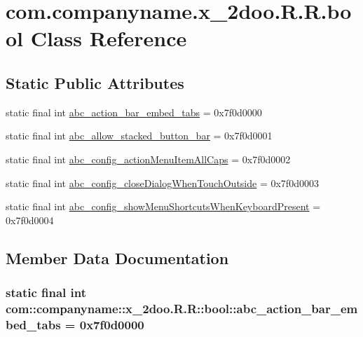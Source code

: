 \hypertarget{classcom_1_1companyname_1_1x__2doo_1_1_r_1_1bool}{
\section{com.companyname.x\_\-2doo.R.R.bool Class Reference}
\label{classcom_1_1companyname_1_1x__2doo_1_1_r_1_1bool}
}
\subsection*{Static Public Attributes}
\begin{CompactItemize}
\item 
static final int \hyperlink{classcom_1_1companyname_1_1x__2doo_1_1_r_1_1bool_326f4aa115b1a29a2c4bd6ce17a3f8cb}{abc\_\-action\_\-bar\_\-embed\_\-tabs} = 0x7f0d0000
\item 
static final int \hyperlink{classcom_1_1companyname_1_1x__2doo_1_1_r_1_1bool_4ff7b303846d6f712f88155152e3f989}{abc\_\-allow\_\-stacked\_\-button\_\-bar} = 0x7f0d0001
\item 
static final int \hyperlink{classcom_1_1companyname_1_1x__2doo_1_1_r_1_1bool_3a1ff4cfabe237f98e87c81c5efecf32}{abc\_\-config\_\-actionMenuItemAllCaps} = 0x7f0d0002
\item 
static final int \hyperlink{classcom_1_1companyname_1_1x__2doo_1_1_r_1_1bool_65e8d37f9e0446bedb057683b549b7c2}{abc\_\-config\_\-closeDialogWhenTouchOutside} = 0x7f0d0003
\item 
static final int \hyperlink{classcom_1_1companyname_1_1x__2doo_1_1_r_1_1bool_7f096c288d04e24b3b4b68c5e5acccd3}{abc\_\-config\_\-showMenuShortcutsWhenKeyboardPresent} = 0x7f0d0004
\end{CompactItemize}


\subsection{Member Data Documentation}
\hypertarget{classcom_1_1companyname_1_1x__2doo_1_1_r_1_1bool_326f4aa115b1a29a2c4bd6ce17a3f8cb}{
\subsubsection[{abc\_\-action\_\-bar\_\-embed\_\-tabs}]{\setlength{\rightskip}{0pt plus 5cm}static final int com::companyname::x\_\-2doo.R.R::bool::abc\_\-action\_\-bar\_\-embed\_\-tabs = 0x7f0d0000}}
\label{classcom_1_1companyname_1_1x__2doo_1_1_r_1_1bool_326f4aa115b1a29a2c4bd6ce17a3f8cb}


